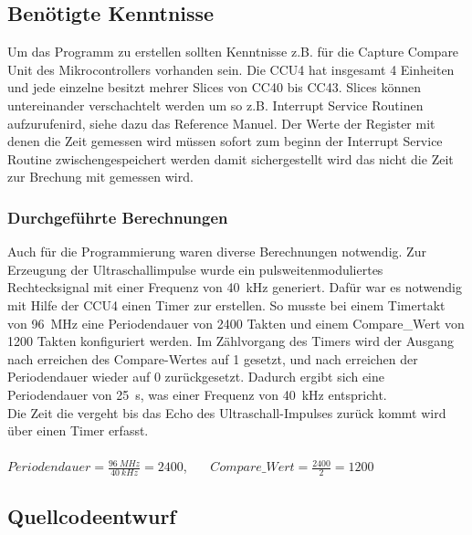 \subsection{Benötigte Kenntnisse}
Um das Programm zu erstellen sollten Kenntnisse z.B. für die Capture Compare Unit des Mikrocontrollers vorhanden sein. Die CCU4 hat insgesamt 4 Einheiten und jede einzelne besitzt mehrer Slices von CC40 bis CC43. Slices können untereinander verschachtelt werden um so z.B. Interrupt Service Routinen aufzurufenird, siehe dazu das Reference Manuel.
Der Werte der Register mit denen die Zeit gemessen wird müssen sofort zum beginn der Interrupt Service Routine zwischengespeichert werden damit sichergestellt wird das nicht die Zeit zur Brechung mit gemessen wird.\\

\subsubsection{Durchgeführte Berechnungen}
Auch für die Programmierung waren diverse Berechnungen notwendig. Zur Erzeugung der Ultraschallimpulse wurde ein pulsweitenmoduliertes Rechtecksignal mit einer Frequenz von 40~kHz generiert. Dafür war es notwendig mit Hilfe der CCU4 einen Timer zur erstellen. So musste bei einem Timertakt von 96~MHz eine Periodendauer von 2400 Takten und einem Compare\_Wert von 1200 Takten  konfiguriert werden. Im Zählvorgang des Timers wird der Ausgang nach erreichen des Compare-Wertes auf 1 gesetzt, und nach erreichen der Periodendauer wieder auf 0 zurückgesetzt. Dadurch ergibt sich eine Periodendauer von 25~\textmu s, was einer Frequenz von 40~kHz entspricht.\\
Die Zeit die vergeht bis das Echo des Ultraschall-Impulses zurück kommt wird über einen Timer erfasst. 
\onehalfspacing \\ \\
\(\displaystyle Periodendauer=\frac{96~MHz}{40~kHz} = 2400 \),  \  \  \    \(\displaystyle Compare\_Wert=\frac{2400}{2} = 1200 \) 
\singlespacing


\subsection{Quellcodeentwurf}

